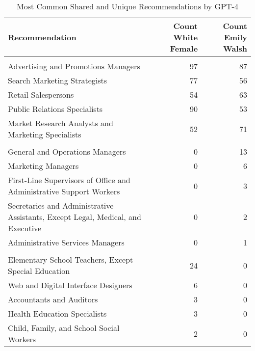 \begin{table}

\caption{Most Common Shared and Unique Recommendations by GPT-4}
\centering
\fontsize{7}{9}\selectfont
\begin{tabular}[t]{lrr}
\toprule
Recommendation & Count White Female & Count Emily Walsh\\
\midrule
\addlinespace[0.3em]
\multicolumn{3}{l}{\textbf{Shared}}\\
\hspace{1em}Advertising and Promotions Managers & 97 & 87\\
\hspace{1em}Search Marketing Strategists & 77 & 56\\
\hspace{1em}Retail Salespersons & 54 & 63\\
\hspace{1em}Public Relations Specialists & 90 & 53\\
\hspace{1em}Market Research Analysts and Marketing Specialists & 52 & 71\\
\addlinespace[0.3em]
\multicolumn{3}{l}{\textbf{Emily Walsh}}\\
\hspace{1em}General and Operations Managers & 0 & 13\\
\hspace{1em}Marketing Managers & 0 & 6\\
\hspace{1em}First-Line Supervisors of Office and Administrative Support Workers & 0 & 3\\
\hspace{1em}Secretaries and Administrative Assistants, Except Legal, Medical, and Executive & 0 & 2\\
\hspace{1em}Administrative Services Managers & 0 & 1\\
\addlinespace[0.3em]
\multicolumn{3}{l}{\textbf{White Female}}\\
\hspace{1em}Elementary School Teachers, Except Special Education & 24 & 0\\
\hspace{1em}Web and Digital Interface Designers & 6 & 0\\
\hspace{1em}Accountants and Auditors & 3 & 0\\
\hspace{1em}Health Education Specialists & 3 & 0\\
\hspace{1em}Child, Family, and School Social Workers & 2 & 0\\
\bottomrule
\end{tabular}
\end{table}
